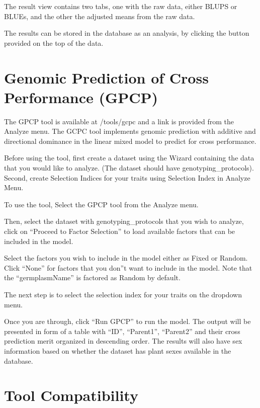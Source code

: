 \documentclass[
  12pt,
]{book}
\begin{document}
The result view contains two tabs, one with the raw data, either BLUPS or BLUEs, and the other the adjusted means from the raw data.

The results can be stored in the database as an analysis, by clicking the button provided on the top of the data.

\hypertarget{genomic-prediction-of-cross-performance-gpcp}{%
\section{Genomic Prediction of Cross Performance (GPCP)}\label{genomic-prediction-of-cross-performance-gpcp}}

The GPCP tool is available at /tools/gcpc and a link is provided from the Analyze menu. The GCPC tool implements genomic prediction with additive and directional dominance in the linear mixed model to predict for cross performance.

Before using the tool, first create a dataset using the Wizard containing the data that you would like to analyze. (The dataset should have genotyping\_protocols). Second, create Selection Indices for your traits using Selection Index in Analyze Menu.

To use the tool, Select the GPCP tool from the Analyze menu.

Then, select the dataset with genotyping\_protocols that you wish to analyze, click on ``Proceed to Factor Selection'' to load available factors that can be included in the model.

Select the factors you wish to include in the model either as Fixed or Random. Click ``None'' for factors that you don''t want to include in the model. Note that the ``germplasmName'' is factored as Random by default.

The next step is to select the selection index for your traits on the dropdown menu.

Once you are through, click ``Run GPCP'' to run the model. The output will be presented in form of a table with ``ID'', ``Parent1'', ``Parent2'' and their cross prediction merit organized in descending order. The results will also have sex information based on whether the dataset has plant sexes available in the database.

\hypertarget{tool-compatibility}{%
\section{Tool Compatibility}\label{tool-compatibility}}
\end{document}
